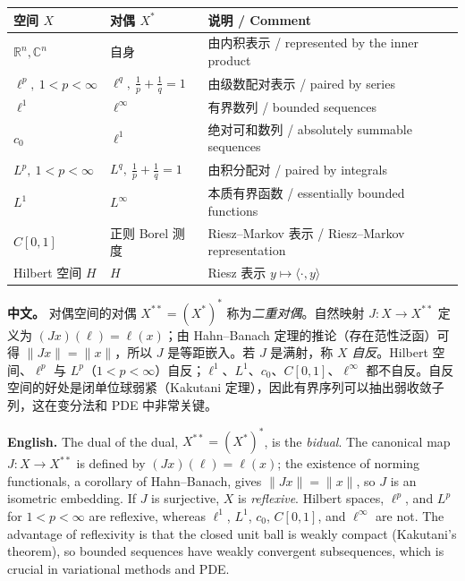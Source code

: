 \documentclass[UTF8,11pt,a4paper]{ctexart}
\newcommand{\APS}[2]{\par\noindent\textbf{中文。} #1\par\noindent\textbf{English.} #2\par\smallskip}
\begin{document}
\noindent\begin{center}\small
\begin{tabular}{@{}p{3.5cm}p{3.4cm}p{8.8cm}@{}}
\toprule
空间 $X$ & 对偶 $X^*$ & 说明 / Comment \\
\midrule
$\mathbb R^n,\mathbb C^n$ & 自身 & 由内积表示 / represented by the inner product \\
$\ell^p,\ 1<p<\infty$ & $\ell^q,\ \frac1p+\frac1q=1$ & 由级数配对表示 / paired by series \\
$\ell^1$ & $\ell^\infty$ & 有界数列 / bounded sequences \\
$c_0$ & $\ell^1$ & 绝对可和数列 / absolutely summable sequences \\
$L^p,\ 1<p<\infty$ & $L^q,\ \frac1p+\frac1q=1$ & 由积分配对 / paired by integrals \\
$L^1$ & $L^\infty$ & 本质有界函数 / essentially bounded functions \\
$C[0,1]$ & 正则 Borel 测度 & Riesz--Markov 表示 / Riesz--Markov representation \\
Hilbert 空间 $H$ & $H$ & Riesz 表示 $y\mapsto\langle\cdot,y\rangle$ \\
\bottomrule
\end{tabular}
\end{center}

\APS{对偶空间的对偶 $X^{**}=(X^*)^*$ 称为\emph{二重对偶}。自然映射 $J:X\to X^{**}$ 定义为 $(Jx)(\ell)=\ell(x)$；由 Hahn--Banach 定理的推论（存在范性泛函）可得 $\|Jx\|=\|x\|$，所以 $J$ 是等距嵌入。若 $J$ 是满射，称 $X$ \emph{自反}。Hilbert 空间、$\ell^p$ 与 $L^p$（$1<p<\infty$）自反；$\ell^1$、$L^1$、$c_0$、$C[0,1]$、$\ell^\infty$ 都不自反。自反空间的好处是闭单位球弱紧（Kakutani 定理），因此有界序列可以抽出弱收敛子列，这在变分法和 PDE 中非常关键。}{The dual of the dual, $X^{**}=(X^*)^*$, is the \emph{bidual}. The canonical map $J:X\to X^{**}$ is defined by $(Jx)(\ell)=\ell(x)$; the existence of norming functionals, a corollary of Hahn--Banach, gives $\|Jx\|=\|x\|$, so $J$ is an isometric embedding. If $J$ is surjective, $X$ is \emph{reflexive}. Hilbert spaces, $\ell^p$, and $L^p$ for $1<p<\infty$ are reflexive, whereas $\ell^1$, $L^1$, $c_0$, $C[0,1]$, and $\ell^\infty$ are not. The advantage of reflexivity is that the closed unit ball is weakly compact (Kakutani's theorem), so bounded sequences have weakly convergent subsequences, which is crucial in variational methods and PDE.}
\end{document}
